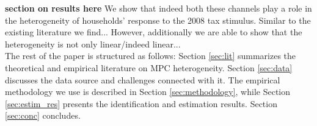 \textbf{section on results here}
We show that indeed both these channels play a role in the heterogeneity of households' response to the 2008 tax stimulus. Similar to the existing literature we find... However, additionally we are able to show that the heterogeneity is not only linear/indeed linear... \\ 
The rest of the paper is structured as follows: Section \ref{sec:lit} summarizes the theoretical and empirical literature on MPC heterogeneity. Section \ref{sec:data} discusses the data source and challenges connected with it. The empirical methodology we use is described in Section \ref{sec:methodology}, while Section \ref{sec:estim_res} presents the identification and estimation results. Section \ref{sec:conc} concludes.